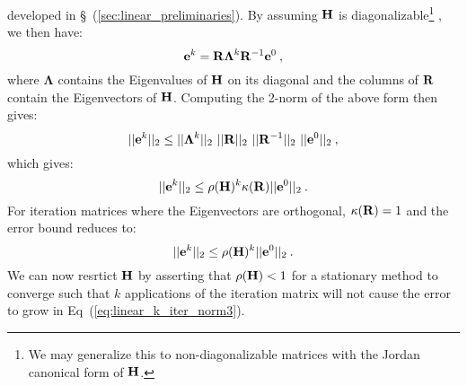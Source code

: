developed in \S~(\ref{sec:linear_preliminaries}). By assuming $\mathbf{H}$
is diagonalizable\footnote{We may generalize this to
  non-diagonalizable matrices with the Jordan canonical form of
  $\mathbf{H}$.} \citep{saad_iterative_2003}, we then have:
\begin{equation}
  \mathbf{e}^{k} =
  \mathbf{R}\boldsymbol{\Lambda}^k\mathbf{R}^{-1}\mathbf{e}^0\:,
  \label{eq:linear_k_iter_error_diag}
\end{equation}
where $\boldsymbol{\Lambda}$ contains the Eigenvalues of $\mathbf{H}$ on
its diagonal and the columns of $\mathbf{R}$ contain the Eigenvectors of
$\mathbf{H}$. Computing the 2-norm of the above form then gives:
\begin{equation}
  ||\ve{e}^{k}||_2 \leq ||\boldsymbol{\Lambda}^k||_2\ 
  ||\ve{R}||_2\ ||\ve{R}^{-1}||_2\ ||\ve{e}^0||_2\:,
  \label{eq:linear_k_iter_norm1}
\end{equation}
which gives:
\begin{equation}
  ||\mathbf{e}^{k}||_2 \leq \rho(\mathbf{H})^k \kappa(\mathbf{R})
  ||\mathbf{e}^0||_2\:.
  \label{eq:linear_k_iter_norm2}
\end{equation}
For iteration matrices where the Eigenvectors are orthogonal,
$\kappa(\mathbf{R})=1$ and the error bound reduces to:
\begin{equation}
  ||\mathbf{e}^{k}||_2 \leq \rho(\mathbf{H})^k
  ||\mathbf{e}^0||_2\:.
  \label{eq:linear_k_iter_norm3}
\end{equation}
We can now resrtict $\mathbf{H}$ by asserting that $\rho(\mathbf{H}) < 1$
for a stationary method to converge such that $k$ applications of the
iteration matrix will not cause the error to grow in
Eq~(\ref{eq:linear_k_iter_norm3}). 

